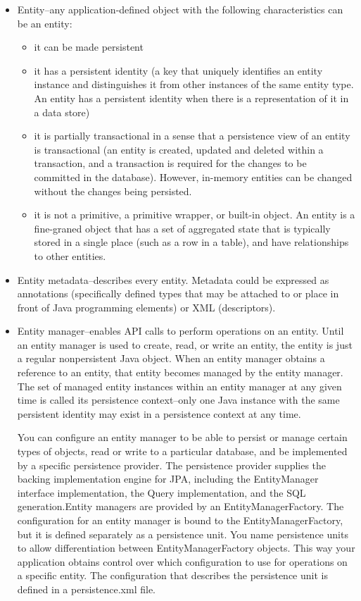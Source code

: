 \begin{itemize}
\item Entity–any application-defined object with the following characteristics can be an entity:
\begin{itemize}
\item it can be made persistent
\item it has a persistent identity (a key that uniquely identifies an entity instance and distinguishes it from other instances of the same entity type. An entity has a persistent identity when there is a representation of it in a data store)
\item it is partially transactional in a sense that a persistence view of an entity is transactional (an entity is created, updated and deleted within a transaction, and a transaction is required for the changes to be committed in the database). However, in-memory entities can be changed without the changes being persisted.
\item it is not a primitive, a primitive wrapper, or built-in object. An entity is a fine-graned object that has a set of aggregated state that is typically stored in a single place (such as a row in a table), and have relationships to other entities.
\end{itemize}
\item Entity metadata–describes every entity. Metadata could be expressed as annotations (specifically defined types that may be attached to or place in front of Java programming elements) or XML (descriptors).
\item Entity manager–enables API calls to perform operations on an entity. Until an entity manager is used to create, read, or write an entity, the entity is just a regular nonpersistent Java object. When an entity manager obtains a reference to an entity, that entity becomes managed by the entity manager. The set of managed entity instances within an entity manager at any given time is called its persistence context–only one Java instance with the same persistent identity may exist in a persistence context at any time.

You can configure an entity manager to be able to persist or manage certain types of objects, read or write to a particular database, and be implemented by a specific persistence provider. The persistence provider supplies the backing implementation engine for JPA, including the EntityManager interface implementation, the Query implementation, and the SQL generation.Entity managers are provided by an EntityManagerFactory. The configuration for an entity manager is bound to the EntityManagerFactory, but it is defined separately as a persistence unit. You name persistence units to allow differentiation between EntityManagerFactory objects. This way your application obtains control over which configuration to use for operations on a specific entity. The configuration that describes the persistence unit is defined in a persistence.xml file.


\end{itemize}
